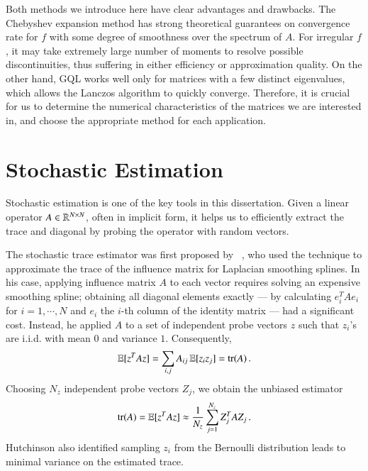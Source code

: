 Both methods we introduce here have clear advantages and drawbacks. The
Chebyshev expansion method has strong theoretical guarantees on convergence rate
for $f$ with some degree of smoothness over the spectrum of $A$. For irregular
$f$, it may take extremely large number of moments to resolve possible
discontinuities, thus suffering in either efficiency or approximation quality.
On the other hand, GQL works well only for matrices with a few distinct
eigenvalues, which allows the Lanczos algorithm to quickly converge. Therefore,
it is crucial for us to determine the numerical characteristics of the matrices
we are interested in, and choose the appropriate method for each application.

\section{Stochastic Estimation}\label{pre:ste}

Stochastic estimation is one of the key tools in this dissertation. Given a
linear operator $A\in\mathbb{R}^{N\mathbin{\times} N}$, often in implicit form, it helps us to
efficiently extract the trace and diagonal by probing the operator with random
vectors. 

The stochastic trace estimator was first proposed by~
\citet{hutchinson1990stochastic}, who used the technique to approximate the
trace of the influence matrix for Laplacian smoothing splines. In his case,
applying influence matrix $A$ to each vector requires solving an expensive
smoothing spline; obtaining all diagonal elements exactly --- by calculating
$e_i^TAe_i$ for $i=1,\cdots, N$ and $e_i$ the $i$\hyp{}th column of the identity
matrix --- had a significant cost. Instead, he applied $A$ to a set of
independent probe vectors $z$ such that $z_i$'s are i.i.d. with mean $0$ and
variance $1$. Consequently, 
\begin{equation}\label{eq:probe_trace}
	\operatorname{\mathbb{E}}[z^TAz] = \sum_{i,j}A_{ij}\operatorname{\mathbb{E}}[z_iz_j] = \operatorname{tr}(A)\,.
\end{equation}
Choosing $N_z$ independent probe vectors $Z_j$, we obtain the unbiased estimator
\begin{equation}\label{eqn:trace_est}
	\operatorname{tr}(A) = \operatorname{\mathbb{E}}[z^TAz] \approx \frac{1}{N_z}\sum_{j=1}^{N_z}Z_j^TAZ_j\,.
\end{equation}
Hutchinson also identified sampling $z_i$ from the  Bernoulli distribution leads
to minimal variance on the estimated trace.

